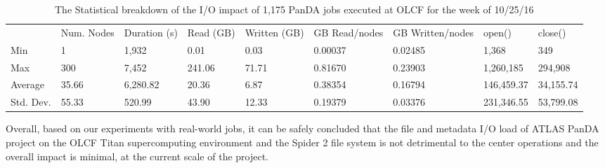 \begin{table}[t]
\centering
\begin{tabular}{lllllllll}
 & Num. Nodes & Duration (s) & Read (GB) & Written (GB) & GB Read/nodes & GB Written/nodes & open() & close() \\
Min & 1 & 1,932 & 0.01 & 0.03 & 0.00037 & 0.02485 & 1,368 & 349 \\
Max & 300 & 7,452 & 241.06 & 71.71 & 0.81670 & 0.23903 & 1,260,185 & 294,908 \\
Average & 35.66 & 6,280.82 & 20.36 & 6.87 & 0.38354 & 0.16794 & 146,459.37 & 34,155.74 \\
Std. Dev. & 55.33 & 520.99 & 43.90 & 12.33 & 0.19379 & 0.03376 & 231,346.55 & 53,799.08
\end{tabular}
\caption{The Statistical breakdown of the I/O impact of 1,175 PanDA jobs executed at OLCF for the week of 10/25/16}
\label{panda-olcf-stats}
\end{table}

Overall, based on our experiments with real-world jobs, it can be safely
concluded that the file and metadata I/O load of ATLAS PanDA project on the
OLCF Titan supercomputing environment and the Spider 2 file system is not
detrimental to the center operations and the overall impact is minimal, at the
current scale of the project. 
